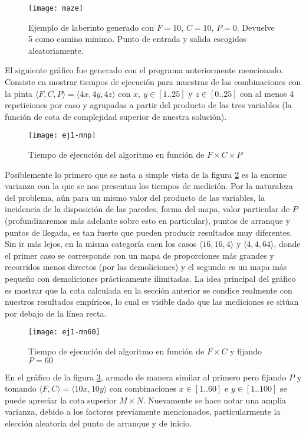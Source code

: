     \begin{figure}[H]
    	\centering
    	\texttt{[image: maze]}
        \caption{Ejemplo de laberinto generado con $F = 10$, $C = 10$, $P = 0$. Devuelve 5 como camino minimo. Punto de entrada y salida escogidos aleatoriamente.}
    	\label{fig:maze}
    \end{figure}



    El siguiente gráfico fue generado con el programa anteriormente mencionado. Consiste en mostrar tiempos de ejecución para muestras de las combinaciones con la pinta $\langle F, C, P \rangle = \langle 4x, 4y, 4z \rangle$ con $x,\ y \in [1..25]$ y $z \in [0..25]$ con al menos 4 repeticiones por caso y agrupadas a partir del producto de las tres variables (la función de cota de complejidad superior de nuestra solución).

    \begin{figure}[H]
    	\centering
    	\texttt{[image: ej1-mnp]}
    	\caption{Tiempo de ejecución del algoritmo en función de $F \times C \times P$}
    	\label{fig:ej1-mnp}
    \end{figure}

    Posiblemente lo primero que se nota a simple vista de la figura \ref{fig:ej1-mnp} es la enorme varianza con la que se nos presentan los tiempos de medición. Por la naturaleza del problema, aún para un mismo valor del producto de las variables, la incidencia de la disposición de las paredes, forma del mapa, valor particular de $P$ (profundizaremos más adelante sobre esto en particular), puntos de arranque y puntos de llegada, es tan fuerte que pueden producir resultados muy diferentes. Sin ir más lejos, en la misma categoría caen los casos $\langle 16, 16, 4 \rangle$ y $\langle 4, 4, 64 \rangle $, donde el primer caso se corresponde con un mapa de proporciones más grandes y recorridos menos directos (por las demoliciones) y el segundo es un mapa más pequeño con demoliciones prácticamente ilimitadas. La idea principal del gráfico es mostrar que la cota calculada en la sección anterior se condice realmente con nuestros resultados empíricos, lo cual es visible dado que las mediciones se sitúan por debajo de la línea recta.

    \begin{figure}[H]
    	\centering
    	\texttt{[image: ej1-mn60]}
    	\caption{Tiempo de ejecución del algoritmo en función de $F \times C$ y fijando $P=60$}
    	\label{fig:ej1-mn60}
    \end{figure}

    En el gráfico de la figura \ref{fig:ej1-mn60}, armado de manera similar al primero pero fijando $P$ y tomando $\langle {F, C} \rangle = \langle {10x, 10y} \rangle$ con combinaciones $x \in [1..60]$ e $y \in [1..100]$  se puede apreciar la cota superior $M\times N$. Nuevamente se hace notar una amplia varianza, debido a los factores previamente mencionados, particularmente la elección aleatoria del punto de arranque y de inicio.
